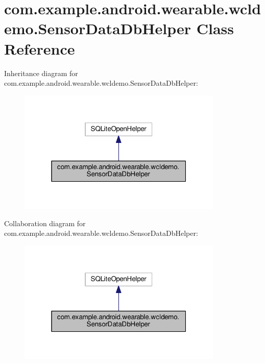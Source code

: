 \hypertarget{classcom_1_1example_1_1android_1_1wearable_1_1wcldemo_1_1SensorDataDbHelper}{}\section{com.\+example.\+android.\+wearable.\+wcldemo.\+Sensor\+Data\+Db\+Helper Class Reference}
\label{classcom_1_1example_1_1android_1_1wearable_1_1wcldemo_1_1SensorDataDbHelper}


Inheritance diagram for com.\+example.\+android.\+wearable.\+wcldemo.\+Sensor\+Data\+Db\+Helper\+:\nopagebreak
\begin{figure}[H]
\begin{center}
\leavevmode
\includegraphics[width=277pt]{de/d31/classcom_1_1example_1_1android_1_1wearable_1_1wcldemo_1_1SensorDataDbHelper__inherit__graph}
\end{center}
\end{figure}


Collaboration diagram for com.\+example.\+android.\+wearable.\+wcldemo.\+Sensor\+Data\+Db\+Helper\+:\nopagebreak
\begin{figure}[H]
\begin{center}
\leavevmode
\includegraphics[width=277pt]{d5/d5c/classcom_1_1example_1_1android_1_1wearable_1_1wcldemo_1_1SensorDataDbHelper__coll__graph}
\end{center}
\end{figure}
